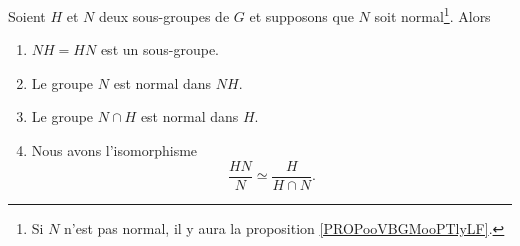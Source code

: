 \begin{theorem}   \label{THOooURXUooQJvkjx}
	Soient \( H\) et \( N\) deux sous-groupes de \( G\) et supposons que \( N\) soit normal\footnote{Si \( N\) n'est pas normal, il y aura la proposition \ref{PROPooVBGMooPTlyLF}.}. Alors
	\begin{enumerate}
		\item
		      \( NH=HN\) est un sous-groupe.
		\item
		      Le groupe \( N\) est normal dans \( NH\).
		\item
		      Le groupe \( N\cap H\) est normal dans \( H\).
		\item   \label{ItemjRPajc}
		      Nous avons l'isomorphisme
		      \begin{equation}
			      \frac{ HN }{ N }\simeq\frac{ H }{ H\cap N }.
		      \end{equation}
	\end{enumerate}
\end{theorem}

